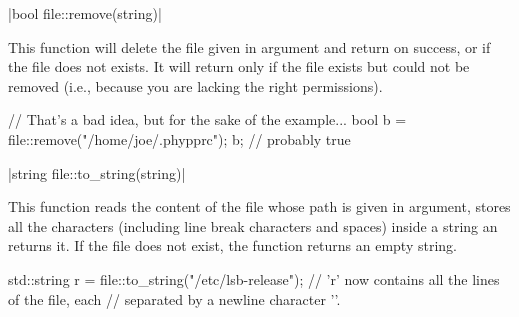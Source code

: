 \funcitem \cppinline|bool file::remove(string)| 

This function will delete the file given in argument and return \cpptrue on success, or if the file does not exists. It will return \cppfalse only if the file exists but could not be removed (i.e., because you are lacking the right permissions).

\begin{example}
\begin{cppcode}
// That's a bad idea, but for the sake of the example...
bool b = file::remove("/home/joe/.phypprc");
b; // probably true
\end{cppcode}
\end{example}

\funcitem \cppinline|string file::to_string(string)| 

This function reads the content of the file whose path is given in argument, stores all the characters (including line break characters and spaces) inside a string an returns it. If the file does not exist, the function returns an empty string.

\begin{example}
\begin{cppcode}
std::string r = file::to_string("/etc/lsb-release");
// 'r' now contains all the lines of the file, each
// separated by a newline character '\n'.
\end{cppcode}
\end{example}
